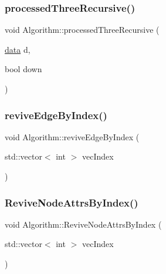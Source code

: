 \subsubsection{\texorpdfstring{processed\+Three\+Recursive()}{processedThreeRecursive()}}
{\footnotesize\ttfamily void Algorithm\+::processed\+Three\+Recursive (\begin{DoxyParamCaption}\item[{\mbox{\hyperlink{_graph_8h_a98cbe1f79429fc62806b32b6e8871d9e}{data}}}]{d,  }\item[{bool}]{down }\end{DoxyParamCaption})}

\mbox{\label{struct_algorithm_a698172d74eea712bc92a75375a1de946}} 
\subsubsection{\texorpdfstring{revive\+Edge\+By\+Index()}{reviveEdgeByIndex()}}
{\footnotesize\ttfamily void Algorithm\+::revive\+Edge\+By\+Index (\begin{DoxyParamCaption}\item[{std\+::vector$<$ int $>$}]{vec\+Index }\end{DoxyParamCaption})}

\mbox{\label{struct_algorithm_a3254a9cd92b951a41d1d9cd931e6672b}} 
\subsubsection{\texorpdfstring{Revive\+Node\+Attrs\+By\+Index()}{ReviveNodeAttrsByIndex()}}
{\footnotesize\ttfamily void Algorithm\+::\+Revive\+Node\+Attrs\+By\+Index (\begin{DoxyParamCaption}\item[{std\+::vector$<$ int $>$}]{vec\+Index }\end{DoxyParamCaption})}

\mbox{\label{struct_algorithm_a946680d5d61db2c1f71ee80f95e6436e}} 
